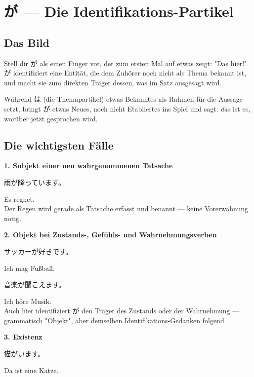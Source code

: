 \documentclass[12pt]{book}
\begin{document}
\chapter{が — Die Identifikations-Partikel}

\section*{Das Bild}

Stell dir が als einen Finger vor, der zum ersten Mal auf etwas zeigt: "Das hier!" が identifiziert eine Entität, die dem Zuhörer noch nicht als Thema bekannt ist, und macht sie zum direkten Träger dessen, was im Satz ausgesagt wird.

Während は (die Themapartikel) etwas Bekanntes als Rahmen für die Aussage setzt, bringt が etwas Neues, noch nicht Etabliertes ins Spiel und sagt: \emph{das} ist es, worüber jetzt gesprochen wird.

\section*{Die wichtigsten Fälle}

\textbf{1. Subjekt einer neu wahrgenommenen Tatsache}
\par\quad 雨が降っています。\\
\par\quad Es regnet.\\

Der Regen wird gerade als Tatsache erfasst und benannt — keine Vorerwähnung nötig.

\textbf{2. Objekt bei Zustands-, Gefühls- und Wahrnehmungsverben}
\par\quad サッカーが好きです。\\
\par\quad Ich mag Fußball.\\

\par\quad 音楽が聞こえます。\\
\par\quad Ich höre Musik.\\

Auch hier identifiziert が den Träger des Zustands oder der Wahrnehmung — grammatisch "Objekt", aber demselben Identifikations-Gedanken folgend.

\textbf{3. Existenz}
\par\quad 猫がいます。\\
\par\quad Da ist eine Katze.\\
\end{document}
